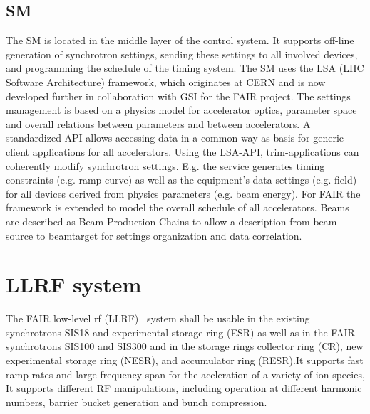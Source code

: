 \subsection{SM}
The \gls{SM} is located in the middle layer of the control system. It supports off-line generation of synchrotron settings, sending these settings to all involved devices,
and programming the schedule of the timing system. The SM uses the LSA (LHC Software Architecture) framework, which originates at CERN and is now developed further in collaboration with GSI for the FAIR project. The settings management is based on a physics model for accelerator optics, parameter space and overall relations between parameters and between accelerators. A standardized API allows accessing data in a common way as basis for generic client applications for all accelerators. Using the LSA-API, trim-applications can coherently modify synchrotron settings. E.g. the service generates timing constraints (e.g. ramp curve) as well as the equipment’s data settings (e.g. field) for all devices derived from physics parameters (e.g. beam energy). For FAIR the framework is extended to model the overall schedule of all accelerators. Beams are described as Beam Production
Chains to allow a description from beam-source to beamtarget for settings organization and data correlation.

\section{LLRF system}
The FAIR low-level rf (\gls{LLRF})~\cite{klingbeil_new_2011} system shall be usable in the existing synchrotrons SIS18 and experimental storage ring (\gls{ESR}) as well as in the FAIR synchrotrons SIS100 and SIS300 and in the storage rings collector ring (\gls{CR}), new experimental storage ring (\gls{NESR}), and accumulator ring (\gls{RESR}).It supports fast ramp rates and large frequency span for the accleration of a variety of ion species, It supports different RF manipulations, including operation at different harmonic numbers, barrier bucket generation and bunch compression. 

